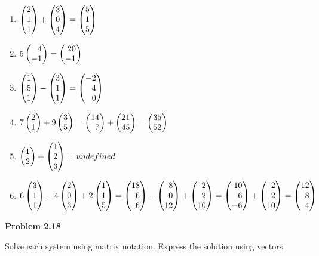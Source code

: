 \documentclass[12pt]{article}
\newenvironment{problem}[1][default]{
  \begin{framed}\begin{minipage}{0.97\textwidth}
  \setlength{\parskip}{4mm}
  {\bf Problem #1}
}{\end{minipage}\end{framed}}
\newcommand\m[2][]{
	\ifthenelse{\equal {#1} {}}
		{\begin{pmatrix*}[r]#2\end{pmatrix*}}
		{\left(\begin{array}{#1}#2\end{array}\right)}
}
\begin{document}
\begin{enumerate}[label=\bf(\alph*)]
	\item $ \m{2 \\ 1 \\ 1} + \m{3 \\ 0 \\ 4} = \m{5 \\ 1 \\ 5} $
	\item $ 5 \m{4 \\ -1} = \m{20 \\ -1} $
	\item $ \m{1 \\ 5 \\ 1} - \m{3 \\ 1 \\ 1} = \m{-2 \\ 4 \\ 0} $
	\item $ 7 \m{2 \\ 1} + 9 \m{3 \\ 5} = \m{14 \\ 7} + \m{21 \\ 45} = \m{35 \\ 52} $
	\item $ \m{1 \\ 2} + \m{1 \\ 2 \\ 3} = undefined $
	\item $ 6 \m{3 \\ 1 \\ 1} - 4 \m{2 \\ 0 \\ 3} + 2 \m{1 \\ 1 \\ 5} = \m{18 \\ 6 \\ 6} - \m{8 \\ 0 \\ 12} + \m{2 \\ 2 \\ 10} = \m{10 \\ 6 \\ -6} + \m{2 \\ 2 \\ 10} = \m{12 \\ 8 \\ 4} $
\end{enumerate}


\begin{problem}[2.18]
Solve each system using matrix notation. Express the solution using vectors.
\end{problem}
\end{document}
